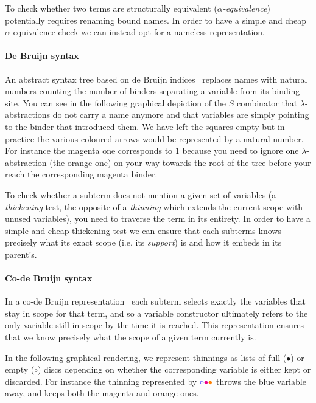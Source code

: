 
To check whether two terms are structurally equivalent (\emph{$\alpha$-equivalence})
potentially requires renaming bound names.
%
In order to have a simple and cheap $\alpha$-equivalence check we can instead opt
for a nameless representation.

\paragraph{De Bruijn syntax}
An abstract syntax tree based on de Bruijn indices~\cite{MANUAL:journals/math/debruijn72}
replaces names with natural numbers counting the number of binders separating a variable
from its binding site.
%
You can see in the following graphical depiction of the $S$ combinator that
$\lambda$-abstractions do not carry a name anymore and that variables are simply pointing
to the binder that introduced them. We have left the squares empty but in practice
the various coloured arrows would be represented by a natural number.
%
For instance the {\color{magenta}magenta} one corresponds to $1$ because you need
to ignore one $\lambda{}$-abstraction (the {\color{orange}orange} one) on your way
towards the root of the tree before your reach the corresponding magenta binder.


To check whether a subterm does not mention a given set of variables
(a \emph{thickening} test, the opposite of a \emph{thinning} which extends the
current scope with unused variables), you need to traverse the term in its entirety.
%
In order to have a simple and cheap thickening test we can ensure that each subterms
knows precisely what its exact scope (i.e. its \emph{support}) is and how it embeds
in its parent's.

\paragraph{Co-de Bruijn syntax}
In a co-de Bruijn
representation~\cite{DBLP:journals/corr/abs-1807-04085} each subterm
selects exactly the variables that stay in scope for that term,
and so a variable constructor ultimately refers to the only variable still
in scope by the time it is reached.
%
This representation ensures that we know precisely what the scope of a given term
currently is.

In the following graphical rendering, we represent thinnings as lists of full
($\bullet$) or empty ($\circ$) discs depending on whether the corresponding
variable is either kept or discarded.
For instance the thinning represented by
$\color{blue}{\circ}\color{magenta}{\bullet}\color{orange}{\bullet}$
throws the {\color{blue}blue} variable away, and keeps both the
{\color{magenta}magenta} and {\color{orange}orange} ones.

